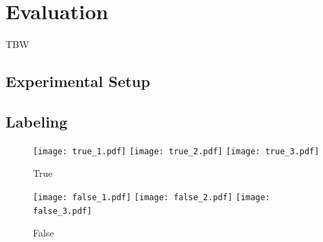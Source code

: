 

    
    


    
    
\chapter{Evaluation}\label{ch:evaluation}\glsresetall
TBW
\section{Experimental Setup}

\section{Labeling}
\begin{figure}
    \centering
    \texttt{[image: true\_1.pdf]}
    \texttt{[image: true\_2.pdf]}
    \texttt{[image: true\_3.pdf]}
    \caption{True}
    \label{fig:label_true}
\end{figure}

\begin{figure}
    \centering
    \texttt{[image: false\_1.pdf]}
    \texttt{[image: false\_2.pdf]}
    \texttt{[image: false\_3.pdf]}
    \caption{False}
    \label{fig:label_false}
\end{figure}

